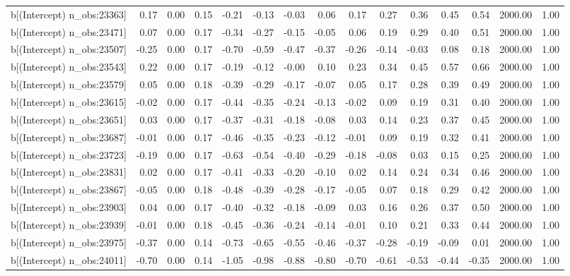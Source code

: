 \begin{table}[ht]
\begin{tabular}{rrrrrrrrrrrrrrr}
  b[(Intercept) n\_obs:23363] & 0.17 & 0.00 & 0.15 & -0.21 & -0.13 & -0.03 & 0.06 & 0.17 & 0.27 & 0.36 & 0.45 & 0.54 & 2000.00 & 1.00 \\ 
  b[(Intercept) n\_obs:23471] & 0.07 & 0.00 & 0.17 & -0.34 & -0.27 & -0.15 & -0.05 & 0.06 & 0.19 & 0.29 & 0.40 & 0.51 & 2000.00 & 1.00 \\ 
  b[(Intercept) n\_obs:23507] & -0.25 & 0.00 & 0.17 & -0.70 & -0.59 & -0.47 & -0.37 & -0.26 & -0.14 & -0.03 & 0.08 & 0.18 & 2000.00 & 1.00 \\ 
  b[(Intercept) n\_obs:23543] & 0.22 & 0.00 & 0.17 & -0.19 & -0.12 & -0.00 & 0.10 & 0.23 & 0.34 & 0.45 & 0.57 & 0.66 & 2000.00 & 1.00 \\ 
  b[(Intercept) n\_obs:23579] & 0.05 & 0.00 & 0.18 & -0.39 & -0.29 & -0.17 & -0.07 & 0.05 & 0.17 & 0.28 & 0.39 & 0.49 & 2000.00 & 1.00 \\ 
  b[(Intercept) n\_obs:23615] & -0.02 & 0.00 & 0.17 & -0.44 & -0.35 & -0.24 & -0.13 & -0.02 & 0.09 & 0.19 & 0.31 & 0.40 & 2000.00 & 1.00 \\ 
  b[(Intercept) n\_obs:23651] & 0.03 & 0.00 & 0.17 & -0.37 & -0.31 & -0.18 & -0.08 & 0.03 & 0.14 & 0.23 & 0.37 & 0.45 & 2000.00 & 1.00 \\ 
  b[(Intercept) n\_obs:23687] & -0.01 & 0.00 & 0.17 & -0.46 & -0.35 & -0.23 & -0.12 & -0.01 & 0.09 & 0.19 & 0.32 & 0.41 & 2000.00 & 1.00 \\ 
  b[(Intercept) n\_obs:23723] & -0.19 & 0.00 & 0.17 & -0.63 & -0.54 & -0.40 & -0.29 & -0.18 & -0.08 & 0.03 & 0.15 & 0.25 & 2000.00 & 1.00 \\ 
  b[(Intercept) n\_obs:23831] & 0.02 & 0.00 & 0.17 & -0.41 & -0.33 & -0.20 & -0.10 & 0.02 & 0.14 & 0.24 & 0.34 & 0.46 & 2000.00 & 1.00 \\ 
  b[(Intercept) n\_obs:23867] & -0.05 & 0.00 & 0.18 & -0.48 & -0.39 & -0.28 & -0.17 & -0.05 & 0.07 & 0.18 & 0.29 & 0.42 & 2000.00 & 1.00 \\ 
  b[(Intercept) n\_obs:23903] & 0.04 & 0.00 & 0.17 & -0.40 & -0.32 & -0.18 & -0.09 & 0.03 & 0.16 & 0.26 & 0.37 & 0.50 & 2000.00 & 1.00 \\ 
  b[(Intercept) n\_obs:23939] & -0.01 & 0.00 & 0.18 & -0.45 & -0.36 & -0.24 & -0.14 & -0.01 & 0.10 & 0.21 & 0.33 & 0.44 & 2000.00 & 1.00 \\ 
  b[(Intercept) n\_obs:23975] & -0.37 & 0.00 & 0.14 & -0.73 & -0.65 & -0.55 & -0.46 & -0.37 & -0.28 & -0.19 & -0.09 & 0.01 & 2000.00 & 1.00 \\ 
  b[(Intercept) n\_obs:24011] & -0.70 & 0.00 & 0.14 & -1.05 & -0.98 & -0.88 & -0.80 & -0.70 & -0.61 & -0.53 & -0.44 & -0.35 & 2000.00 & 1.00 \\ 

\end{tabular}
\end{table}
